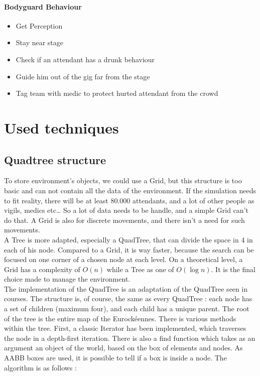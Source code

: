\paragraph{Bodyguard Behaviour}

\begin{itemize}
	\item Get Perception
	\item Stay near stage
	\item Check if an attendant has a drunk behaviour
	\item Guide him out of the gig far from the stage
	\item Tag team with medic to protect hurted attendant from the crowd
\end{itemize}

\newpage

\section{Used techniques}

\subsection{Quadtree structure}

To store environment’s objects, we could use a Grid, but this structure is too
basic and can not contain all the data of the environment. If the simulation
needs to fit reality, there will be at least 80.000 attendants, and a lot of
other people as vigils, medics etc… So a lot of data needs to be handle, and a
simple Grid can’t do that. A Grid is also for discrete movements, and there
isn’t a need for such movements.\\

A Tree is more adapted, especially a QuadTree, that can divide the space in 4 in
each of his node. Compared to a Grid, it is way faster, because the search can
be focused on one corner of a chosen node at each level. On a theoretical level,
a Grid has a complexity of $O(n)$ while a Tree as one of $O(\log n)$. It is the
final choice made to manage the environment.\\

The implementation of the QuadTree is an adaptation of the QuadTree seen in
courses. The structure is, of course, the same as every QuadTree : each node has
a set of children (maximum four), and each child has a unique parent. The root
of the tree is the entire map of the Eurockéennes. There is various methods
within the tree. First, a classic Iterator has been implemented, which traverses
the node in a depth-first iteration. There is also a find function which takes
as an argument an object of the world, based on the box of elements and nodes.
As AABB boxes are used, it is possible to tell if a box is inside a node. The
algorithm is as follows :\\

